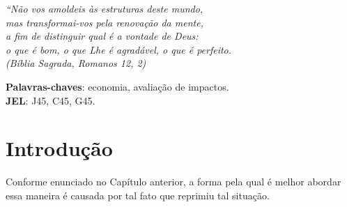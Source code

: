 \documentclass[12pt,english, french, spanish, brazil,a4paper,twoside, openright]{abntex2}	%
\begin{document}
\begin{agradecimentos}


	
\end{agradecimentos}

\begin{epigrafe}
	\vspace*{\fill}
	\begin{flushright}
		\textit{``Não vos amoldeis às estruturas deste mundo, \\
			mas transformai-vos pela renovação da mente, \\
			a fim de distinguir qual é a vontade de Deus: \\
			o que é bom, o que Lhe é agradável, o que é perfeito.\\
			(Bíblia Sagrada, Romanos 12, 2)}
	\end{flushright}
\end{epigrafe}




\setlength{\absparsep}{18pt} %
\begin{resumoumacoluna}
	
	
		\vspace{\onelineskip}
	
	\noindent
	\textbf{Palavras-chaves}: economia, avaliação de impactos. \\	%
	\textbf{JEL}: J45, C45, G45.	%
	
	
	\end{resumoumacoluna}




\tableofcontents*
\cleardoublepage



\textual	%
\chapter{Introdução}

Conforme enunciado no Capítulo anterior, a forma pela qual é melhor
abordar essa maneira é causada por tal fato que reprimiu tal situação.
\end{document}
